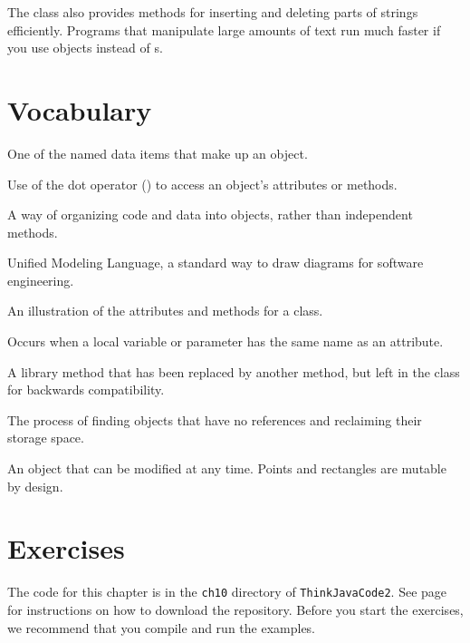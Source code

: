 The  class also provides methods for inserting and deleting parts of strings efficiently.
Programs that manipulate large amounts of text run much faster if you use  objects instead of s.


\section{Vocabulary}

\begin{description}

One of the named data items that make up an object.

Use of the dot operator () to access an object's attributes or methods.

%

A way of organizing code and data into objects, rather than independent methods.

Unified Modeling Language, a standard way to draw diagrams for software engineering.

An illustration of the attributes and methods for a class.

Occurs when a local variable or parameter has the same name as an attribute.

A library method that has been replaced by another method, but left in the class for backwards compatibility.

The process of finding objects that have no references and reclaiming their storage space.

An object that can be modified at any time.
Points and rectangles are mutable by design.

\end{description}


\section{Exercises}

The code for this chapter is in the {\tt ch10} directory of {\tt ThinkJavaCode2}.
See page~\pageref{code} for instructions on how to download the repository.
Before you start the exercises, we recommend that you compile and run the examples.

